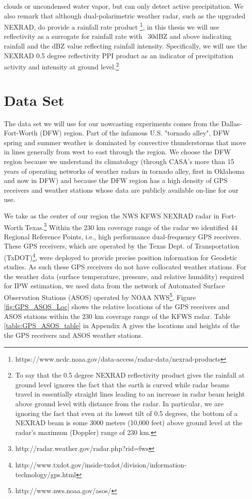 \documentclass[proposal]{umassthesis}
\begin{document}
{ clouds or uncondensed water vapor, but can only detect active
 precipitation.
 We also remark that although dual-polarimetric weather radar, such as
 the upgraded NEXRAD, do provide a rainfall rate product \footnote{https://www.ncdc.noaa.gov/data-access/radar-data/nexrad-products}, in this
 thesis we will use reflectivity as a surrogate for rainfall rate
 with ~30dBZ and above indicating rainfall and the dBZ value reflecting
 rainfall intensity.
 Specifically, we will use the NEXRAD 0.5 degree reflectivity PPI product
 as an indicator of precipitation activity and intensity at ground level.\footnote{To say that the 0.5 degree NEXRAD reflectivity product gives the rainfall at ground level ignores the fact that the earth is
 curved while radar beams travel in essentially straight lines leading
 to an increase in radar beam height above ground level with distance from
 the radar. In particular, we are ignoring the fact that even at its
 lowest tilt of 0.5 degrees, the bottom of a NEXRAD beam is some 3000
 meters (10,000 feet) above ground level at the radar's maximum (Doppler)
 range of 230 km.}

\chapter{Data Set}

The data set we will use for our nowcasting experiments comes from the Dallas-Fort-Worth (DFW) region. Part of the infamous U.S. "tornado alley", DFW spring and summer weather is dominated by convective thunderstorms that move in lines generally from west to east through the region. We choose the DFW region because we understand its climatology (through CASA's more than 15 years of operating networks of weather radars in tornado alley, first in Oklahoma and now in DFW) and because the DFW region has a high density of GPS receivers and weather stations whose data are publicly available on-line for our use.

We take as the center of our region the NWS KFWS NEXRAD radar in Fort-Worth Texas.\footnote{http://radar.weather.gov/radar.php?rid=fws} Within the 230 km coverage range of the radar we identified 44 Regional Reference Points, i.e., high performance dual-frequency GPS receivers. These GPS receivers, which are operated by the Texas Dept. of Transportation (TxDOT)\footnote{http://www.txdot.gov/inside-txdot/division/information-technology/gps.html}, were deployed to provide precise position information for Geodetic studies. As such these GPS receivers do not have collocated weather stations. For the weather data (surface temperature, pressure, and relative humidity) required for IPW estimation, we used data from the network of Automated Surface Observation Stations (ASOS) operated by NOAA NWS\footnote{http://www.nws.noaa.gov/asos/}. Figure \ref{fig:GPS_ASOS_Loc} shows the relative locations of the GPS receivers and ASOS stations within the 230 km coverage range of the KFWS radar. Table \ref{table:GPS_ASOS_table} in Appendix A gives the locations and heights of the the GPS receivers and ASOS weather stations.

}
\end{document}
